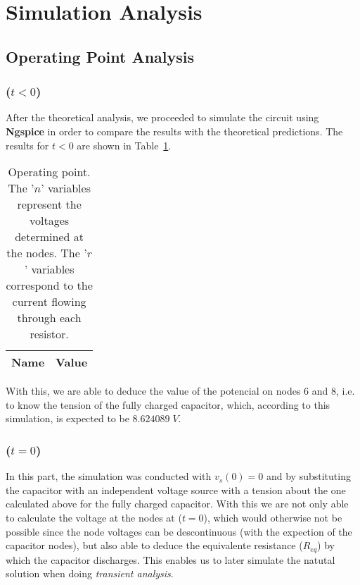 \newpage

\section{Simulation Analysis}
\label{sec:simulation}

\subsection{Operating Point Analysis}
\label{sec:op_point}

\subsubsection{($t < 0$)}

After the theoretical analysis, we proceeded to simulate the circuit using {\bf Ngspice} in order to compare the results with the theoretical predictions. The results for $t < 0$ are shown in Table~\ref{tab:op1}.

\begin{table}[H]
	\centering
	\begin{tabular}{|l|c|}
		\hline    
		    {\bf Name} & {\bf Value} \\
                    \hline
                    \hline
		
	\end{tabular}
	\caption{Operating point. The '$n$' variables represent the voltages determined at the nodes. The '$r$' variables correspond to the current flowing through each resistor.}
	\label{tab:op1}
\end{table}

With this, we are able to deduce the value of the potencial on nodes 6 and 8, i.e. to know the tension of the fully charged capacitor, which, according to this simulation, is expected to be $8.624089\;V$.

\subsubsection{($t = 0$)}

In this part, the simulation was conducted with $v_s(0) = 0$ and by substituting the capacitor with an independent voltage source with a tension about the one calculated above for the fully charged capacitor. With this we are not only able to calculate the voltage at the nodes at ($t = 0$), which would otherwise not be possible since the node voltages can be descontinuous (with the expection of the capacitor nodes), but also able to deduce the equivalente resistance ($R_{eq}$) by which the capacitor discharges. This enables us to later simulate the natutal solution when doing \emph{transient analysis}.

